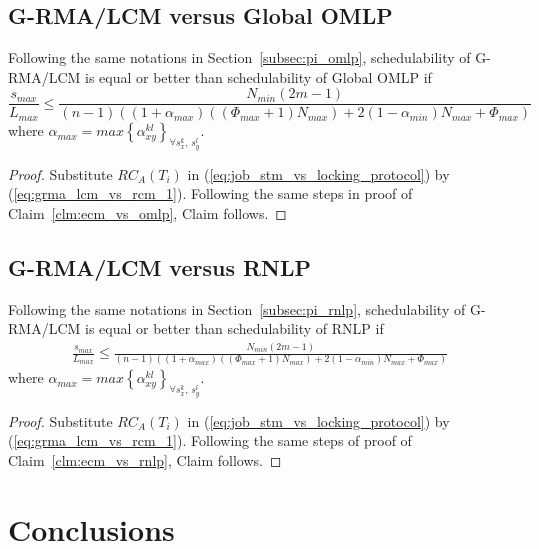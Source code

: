 \subsection{G-RMA/LCM versus Global OMLP}\label{subsec:grma_lcm_vs_omlp}
%
\begin{clm}\label{clm:grma_lcm_vs_omlp}
%
Following the same notations in Section~\ref{subsec:pi_omlp}, schedulability of G-RMA/LCM is equal or better than schedulability of Global OMLP if 
%
\begin{equation}
\frac{s_{max}}{L_{max}}\le\frac{N_{min}\left(2m-1\right)}{\left(n-1\right)\left(\left(1+\alpha_{max}\right)\left(\left(\Phi_{max}+1\right)N_{max}\right)+2\left(1-\alpha_{min}\right)N_{max}+\Phi_{max}\right)}
\label{eq:gedf_lcm_omlp_cmp_final}
\end{equation}
%
where $\alpha_{max}=max\left\{\alpha_{xy}^{kl}\right\}_{\forall s_x^k,\,s_y^l}$.
\end{clm}
%
\begin{proof}
%
Substitute $RC_{A}(T_{i})$ in (\ref{eq:job_stm_vs_locking_protocol})
by (\ref{eq:grma_lcm_vs_rcm_1}). Following the same steps in proof of Claim~\ref{clm:ecm_vs_omlp}, Claim follows.
%
\end{proof}
%
\subsection{G-RMA/LCM versus RNLP}\label{subsec:grma_lcm_vs_rnlp}
%
\begin{clm}\label{clm:grma_lcm_vs_rnlp}
%
Following the same notations in Section~\ref{subsec:pi_rnlp}, schedulability of G-RMA/LCM is equal or better than schedulability of RNLP if 
%
\begin{eqnarray}
\frac{s_{max}}{L_{max}}\le\frac{N_{min}\left(2m-1\right)}{\left(n-1\right)\left(\left(1+\alpha_{max}\right)\left(\left(\Phi_{max}+1\right)N_{max}\right)+2\left(1-\alpha_{min}\right)N_{max}+\Phi_{max}\right)}
\label{eq:grma_lcm_rnlp_cmp_final}
\end{eqnarray}
%
where $\alpha_{max}=max\left\{\alpha_{xy}^{kl}\right\}_{\forall s_x^k,\,s_y^l}$.
%
\end{clm}
%
\begin{proof}
%
Substitute $RC_{A}(T_{i})$ in (\ref{eq:job_stm_vs_locking_protocol})
by (\ref{eq:grma_lcm_vs_rcm_1}). Following the same steps of proof of Claim~\ref{clm:ecm_vs_rnlp}, Claim follows.
%
\end{proof}
%
\section{Conclusions}
\label{sec:conclusions_lcm}

